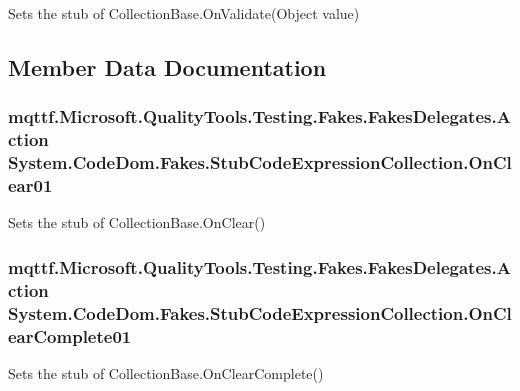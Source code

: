 Sets the stub of Collection\-Base.\-On\-Validate(\-Object value)



\subsection{Member Data Documentation}
\hypertarget{class_system_1_1_code_dom_1_1_fakes_1_1_stub_code_expression_collection_ae13b8b4b4d322b561b32c11fa8bea3db}{
\subsubsection[{On\-Clear01}]{\setlength{\rightskip}{0pt plus 5cm}mqttf.\-Microsoft.\-Quality\-Tools.\-Testing.\-Fakes.\-Fakes\-Delegates.\-Action System.\-Code\-Dom.\-Fakes.\-Stub\-Code\-Expression\-Collection.\-On\-Clear01}}\label{class_system_1_1_code_dom_1_1_fakes_1_1_stub_code_expression_collection_ae13b8b4b4d322b561b32c11fa8bea3db}


Sets the stub of Collection\-Base.\-On\-Clear()

\hypertarget{class_system_1_1_code_dom_1_1_fakes_1_1_stub_code_expression_collection_ab307d0757a291fed3a5746405a0576aa}{
\subsubsection[{On\-Clear\-Complete01}]{\setlength{\rightskip}{0pt plus 5cm}mqttf.\-Microsoft.\-Quality\-Tools.\-Testing.\-Fakes.\-Fakes\-Delegates.\-Action System.\-Code\-Dom.\-Fakes.\-Stub\-Code\-Expression\-Collection.\-On\-Clear\-Complete01}}\label{class_system_1_1_code_dom_1_1_fakes_1_1_stub_code_expression_collection_ab307d0757a291fed3a5746405a0576aa}


Sets the stub of Collection\-Base.\-On\-Clear\-Complete()

